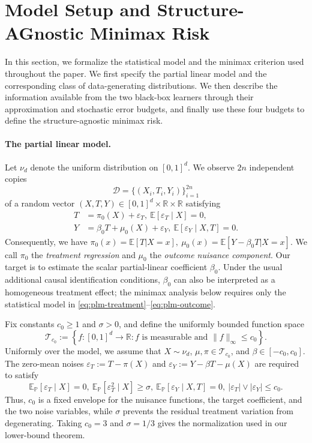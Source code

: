 \documentclass[11pt]{article}
\begin{document}
\section{Model Setup and Structure-AGnostic Minimax Risk}
\label{sec:setup}

In this section, we formalize the statistical model and the minimax criterion
used throughout the paper.  We first specify the partial linear model and the
corresponding class of data-generating distributions.  We then describe the
information available from the two black-box learners through their
approximation and stochastic error budgets, and finally use these four
budgets to define the structure-agnostic minimax risk.

\paragraph{The partial linear model.}
Let \(\nu_d\) denote the uniform distribution on \([0,1]^d\).  We observe
\(2n\) independent copies
\[
\mathcal D=\{(X_i,T_i,Y_i)\}_{i=1}^{2n}
\]
of a random vector \((X,T,Y)\in[0,1]^d\times\mathbb R\times\mathbb R\)
satisfying
\begin{align}
T
&=\pi_0(X)+\varepsilon_T,\ 
\mathbb E[\varepsilon_T\mid X]=0,
\label{eq:plm-treatment}
\\
Y
&=\beta_0T+\mu_0(X)+\varepsilon_Y,\ 
\mathbb E[\varepsilon_Y\mid X,T]=0.
\label{eq:plm-outcome}
\end{align}
Consequently, we have $\pi_0(x)=\mathbb E[T| X=x],
\ 
\mu_0(x)=\mathbb E[Y-\beta_0T| X=x]$.
We call \(\pi_0\) the \emph{treatment regression} and \(\mu_0\) the
\emph{outcome nuisance component}. Our target is to estimate the scalar
partial-linear coefficient \(\beta_0\).  Under the usual additional causal
identification conditions, \(\beta_0\) can also be interpreted as a
homogeneous treatment effect; the minimax analysis below requires only the
statistical model in \eqref{eq:plm-treatment}--\eqref{eq:plm-outcome}.

Fix constants \(c_0\geq1\) and \(\sigma>0\), and define the uniformly
bounded function space
\[
\mathcal T_{c_0}
:=
\left\{
f:[0,1]^d\to\mathbb R:
f\text{ is measurable and }\|f\|_\infty\leq c_0
\right\}.
\]
Uniformly over the model, we assume that \(X\sim\nu_d\),
\(\mu,\pi\in\mathcal T_{c_0}\), and \(\beta\in[-c_0,c_0]\).  The zero-mean noises
\(\varepsilon_T:=T-\pi(X)\) and
\(\varepsilon_Y:=Y-\beta T-\mu(X)\) are required to satisfy
\[
\mathbb E_{\mathbb P}[\varepsilon_T\mid X]=0,
\ 
\mathbb E_{\mathbb P}[\varepsilon_T^2\mid X]\geq\sigma,
\ 
\mathbb E_{\mathbb P}[\varepsilon_Y\mid X,T]=0,
\ 
|\varepsilon_T|\vee|\varepsilon_Y|\leq c_0.
\]
Thus, \(c_0\) is a fixed envelope for the nuisance functions, the target
coefficient, and the two noise variables, while \(\sigma\) prevents the
residual treatment variation from degenerating.  Taking \(c_0=3\) and
\(\sigma=1/3\) gives the normalization used in our lower-bound theorem.
\end{document}
